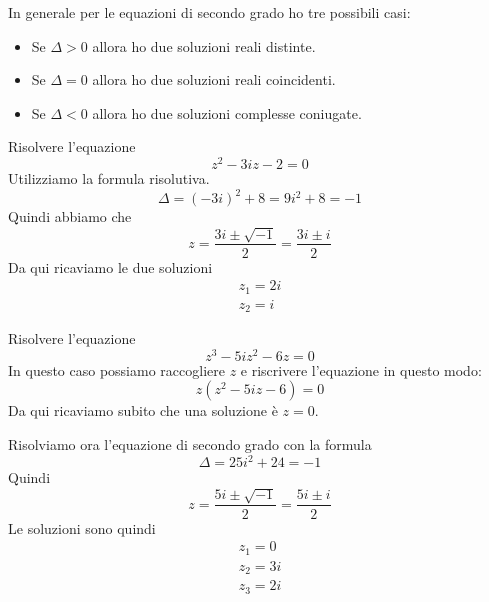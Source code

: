 In generale per le equazioni di secondo grado ho tre possibili casi:
\begin{itemize}
	\item Se $\Delta > 0$ allora ho due soluzioni reali distinte.
	\item Se $\Delta = 0$ allora ho due soluzioni reali coincidenti.
	\item Se $\Delta < 0$ allora ho due soluzioni complesse coniugate.
\end{itemize}

\begin{example}
	Risolvere l'equazione
	\begin{equation*}
		z^2 - 3iz - 2 = 0
	\end{equation*}
	Utilizziamo la formula risolutiva.
	\begin{equation*}
		\Delta = (-3i)^2 + 8 = 9i^2 + 8 = -1
	\end{equation*}
	Quindi abbiamo che
	\begin{equation*}
		z = \frac{3i \pm \sqrt{-1}}{2} = \frac{3i \pm i}{2}
	\end{equation*}
	Da qui ricaviamo le due soluzioni
	\begin{gather*}
		z_1 = 2i \\
		z_2 = i
	\end{gather*}
\end{example}

\begin{example}
	Risolvere l'equazione
	\begin{equation*}
		z^3 - 5iz^2 - 6z = 0
	\end{equation*}
	In questo caso possiamo raccogliere $z$ e riscrivere l'equazione in questo modo:
	\begin{equation*}
		z(z^2 - 5iz - 6) = 0
	\end{equation*}
	Da qui ricaviamo subito che una soluzione \`e $z = 0$.

	Risolviamo ora l'equazione di secondo grado con la formula
	\begin{equation*}
		\Delta = 25 i^2 + 24 = -1
	\end{equation*}
	Quindi
	\begin{equation*}
		z = \frac{5i \pm \sqrt{-1}}{2} = \frac{5i \pm i}{2}
	\end{equation*}
	Le soluzioni sono quindi
	\begin{gather*}
		z_1 = 0  \\
		z_2 = 3i \\
		z_3 = 2i
	\end{gather*}
\end{example}


